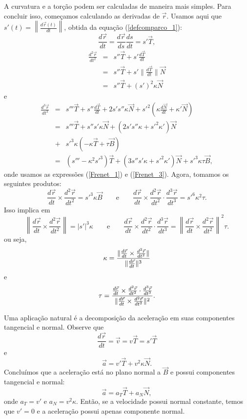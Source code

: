 A curvatura e a torção podem ser calculadas de maneira mais simples. Para concluir isso, começamos calculando as derivadas de $\vec{r}$. Usamos aqui que $s'(t)=\left\|\frac{d\vec{r}(t)}{dt}\right\|$, obtida da equação (\ref{defcomparco_1}):
$$
\frac{d\vec{r}}{dt}=\frac{d\vec{r}}{ds}\frac{ds}{dt}=s' \vec{T},
$$
\begin{eqnarray*}
\frac{d^2\vec{r}}{dt^2}&=&s'' \vec{T}+s' \frac{d\vec{T}}{dt}\\&=&s'' \vec{T}+s' \|\frac{d\vec{T}}{dt}\|\vec{N}\\
&=&s'' \vec{T}+(s')^2 \kappa \vec{N}
\end{eqnarray*}
e
\begin{eqnarray*}
\frac{d^3\vec{r}}{dt^3}&=&s''' \vec{T}+s''\frac{d\vec{T}}{dt}+2s's''\kappa \vec{N}+s'^2 \left(\kappa \frac{d\vec{N}}{dt}+\kappa' \vec{N}\right)\\
&=&s''' \vec{T}+s''s'\kappa \vec{N}+\left(2s's''\kappa+s'^2\kappa'\right) \vec{N}\\
&+&s'^3 \kappa (-\kappa \vec{T}+\tau\vec{B})\\
&=&\left(s'''-\kappa^2s'^3\right) \vec{T}+\left(3s''s'\kappa +s'^2\kappa'\right)\vec{N}+s'^3 \kappa \tau\vec{B},
\end{eqnarray*}
onde usamos as expressões (\ref{Frenet_1}) e (\ref{Frenet_3}). Agora, tomamos os seguintes produtos:
$$
\frac{d\vec{r}}{dt} \times \frac{d^2 \vec{r}}{dt^2}=s'^3\kappa \vec{B}\qquad\text{e}\qquad
\frac{d\vec{r}}{dt} \times \frac{d^2\vec{r}}{dt^2} \cdot \frac{d^3\vec{r}}{dt^3}=s'^6\kappa^2\tau.
$$
Isso implica em 
$$
\left\|\frac{d\vec{r}}{dt} \times \frac{d^2\vec{r}}{dt^2}\right\|=|s'|^3\kappa\qquad\text{e}\qquad
\frac{d\vec{r}}{dt} \times \frac{d^2\vec{r}}{dt^2} \cdot \frac{d^3 \vec{r}}{dt^3}=\left\|\frac{d\vec{r}}{dt} \times \frac{d^2\vec{r}}{dt^2}\right\|^2\tau.
$$
ou seja,
\begin{equation}{\label{curvatura_2}}
\kappa =\frac{\|\frac{d\vec{r}}{dt} \times \frac{d^2 \vec{r}}{dt^2}\|}{\|\frac{d\vec{r}}{dt}\|^3}
\end{equation}
e
\begin{equation}{\label{torcao_2}}
\tau=\frac{\frac{d\vec{r}}{dt} \times \frac{d^2 \vec{r}}{dt^2} \cdot \frac{d^3 \vec{r}}{dt^3} }{\|\frac{d\vec{r}}{dt} \times \frac{d^2\vec{r}}{dt^2}\|^2}.
\end{equation}

\begin{obs}Uma aplicação natural é a decomposição da aceleração em suas componentes tangencial e normal. Observe que
$$
\frac{d\vec{r}}{dt}=\vec{v}=v\vec{T}=s' \vec{T}
$$
e
$$
\vec{a}=v' \vec{T}+v^2 \kappa \vec{N}.
$$
Concluímos que a aceleração está no plano normal a $\vec{B}$ e possui componentes tangencial e normal:
$$
\vec{a}=a_T \vec{T}+a_N \vec{N},
$$
onde $a_T=v'$ e $a_N=v^2\kappa$. Então, se a velocidade possui normal constante, temos que $v'=0$ e a aceleração possui apenas componente normal.

\end{obs}

